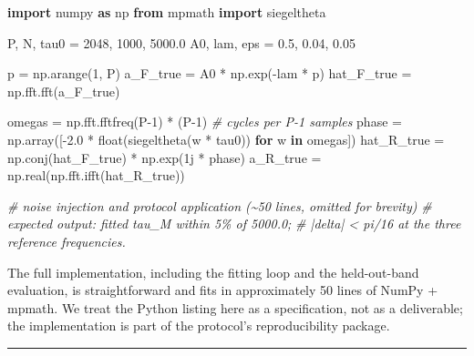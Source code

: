 \documentclass[
  letterpaper,
  11pt]{article}
\newenvironment{Shaded}{}{}
\newcommand{\BuiltInTok}[1]{\textcolor[rgb]{0.00,0.50,0.00}{#1}}
\newcommand{\CommentTok}[1]{\textcolor[rgb]{0.38,0.63,0.69}{\textit{#1}}}
\newcommand{\ControlFlowTok}[1]{\textcolor[rgb]{0.00,0.44,0.13}{\textbf{#1}}}
\newcommand{\DecValTok}[1]{\textcolor[rgb]{0.25,0.63,0.44}{#1}}
\newcommand{\FloatTok}[1]{\textcolor[rgb]{0.25,0.63,0.44}{#1}}
\newcommand{\ImportTok}[1]{\textcolor[rgb]{0.00,0.50,0.00}{\textbf{#1}}}
\newcommand{\KeywordTok}[1]{\textcolor[rgb]{0.00,0.44,0.13}{\textbf{#1}}}
\newcommand{\NormalTok}[1]{#1}
\newcommand{\OperatorTok}[1]{\textcolor[rgb]{0.40,0.40,0.40}{#1}}
\newcommand{\OtherTok}[1]{\textcolor[rgb]{0.00,0.44,0.13}{#1}}
\theoremstyle{plain}
\theoremstyle{definition}
\theoremstyle{remark}
\begin{document}
\begin{Shaded}
\begin{Highlighting}[]
\ImportTok{import}\NormalTok{ numpy }\ImportTok{as}\NormalTok{ np}
\ImportTok{from}\NormalTok{ mpmath }\ImportTok{import}\NormalTok{ siegeltheta}

\NormalTok{P, N, tau0 }\OperatorTok{=} \DecValTok{2048}\NormalTok{, }\DecValTok{1000}\NormalTok{, }\FloatTok{5000.0}
\NormalTok{A0, lam, eps }\OperatorTok{=} \FloatTok{0.5}\NormalTok{, }\FloatTok{0.04}\NormalTok{, }\FloatTok{0.05}

\NormalTok{p }\OperatorTok{=}\NormalTok{ np.arange(}\DecValTok{1}\NormalTok{, P)}
\NormalTok{a\_F\_true }\OperatorTok{=}\NormalTok{ A0 }\OperatorTok{*}\NormalTok{ np.exp(}\OperatorTok{{-}}\NormalTok{lam }\OperatorTok{*}\NormalTok{ p)}
\NormalTok{hat\_F\_true }\OperatorTok{=}\NormalTok{ np.fft.fft(a\_F\_true)}

\NormalTok{omegas }\OperatorTok{=}\NormalTok{ np.fft.fftfreq(P}\OperatorTok{{-}}\DecValTok{1}\NormalTok{) }\OperatorTok{*}\NormalTok{ (P}\OperatorTok{{-}}\DecValTok{1}\NormalTok{)             }\CommentTok{\# cycles per P{-}1 samples}
\NormalTok{phase }\OperatorTok{=}\NormalTok{ np.array([}\OperatorTok{{-}}\FloatTok{2.0} \OperatorTok{*} \BuiltInTok{float}\NormalTok{(siegeltheta(w }\OperatorTok{*}\NormalTok{ tau0)) }\ControlFlowTok{for}\NormalTok{ w }\KeywordTok{in}\NormalTok{ omegas])}
\NormalTok{hat\_R\_true }\OperatorTok{=}\NormalTok{ np.conj(hat\_F\_true) }\OperatorTok{*}\NormalTok{ np.exp(}\OtherTok{1j} \OperatorTok{*}\NormalTok{ phase)}
\NormalTok{a\_R\_true }\OperatorTok{=}\NormalTok{ np.real(np.fft.ifft(hat\_R\_true))}

\CommentTok{\# noise injection and protocol application (\textasciitilde{}50 lines, omitted for brevity)}
\CommentTok{\# expected output: fitted tau\_M within 5\% of 5000.0;}
\CommentTok{\# |delta| \textless{} pi/16 at the three reference frequencies.}
\end{Highlighting}
\end{Shaded}

The full implementation, including the fitting loop and the held-out-band evaluation, is straightforward and fits in approximately 50 lines of NumPy + mpmath. We treat the Python listing here as a specification, not as a deliverable; the implementation is part of the protocol's reproducibility package.

\begin{center}\rule{0.5\linewidth}{0.5pt}\end{center}
\end{document}
